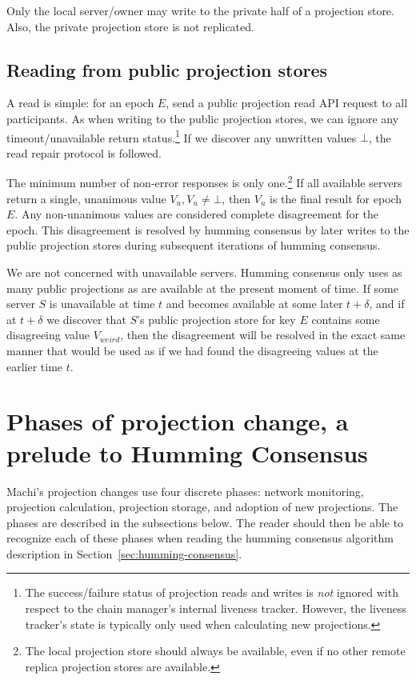 \documentclass[preprint,10pt]{sigplanconf}
\begin{document}
Only the local server/owner may write to the private half of a
projection store.  Also, the private projection store is not replicated.

\subsection{Reading from public projection stores}
\label{sub:proj-store-reading}

A read is simple: for an epoch $E$, send a public projection read API
request to all participants.  As when writing to the public projection
stores, we can ignore any timeout/unavailable return
status.\footnote{The success/failure status of projection reads and
  writes is {\em not} ignored with respect to the chain manager's
  internal liveness tracker.  However, the liveness tracker's state is
  typically only used when calculating new projections.}  If we
discover any unwritten values $\bot$, the read repair protocol is
followed.

The minimum number of non-error responses is only one.\footnote{The local
projection store should always be available, even if no other remote
replica projection stores are available.}  If all available servers
return a single, unanimous value $V_u, V_u \ne \bot$, then $V_u$ is
the final result for epoch $E$.
Any non-unanimous values are considered complete disagreement for the
epoch.  This disagreement is resolved by humming consensus by later
writes to the public projection stores during subsequent iterations of
humming consensus.

We are not concerned with unavailable servers.  Humming consensus
only uses as many public projections as are available at the present
moment of time.  If some server $S$ is unavailable at time $t$ and
becomes available at some later $t+\delta$, and if at $t+\delta$ we
discover that $S$'s public projection store for key $E$
contains some disagreeing value $V_{weird}$, then the disagreement
will be resolved in the exact same manner that would be used as if we
had found the disagreeing values at the earlier time $t$.

\section{Phases of projection change, a prelude to Humming Consensus}
\label{sec:phases-of-projection-change}

Machi's projection changes use four discrete phases: network monitoring,
projection calculation, projection storage, and
adoption of new projections.  The phases are described in the
subsections below.  The reader should then be able to recognize each
of these phases when reading the humming consensus algorithm
description in Section~\ref{sec:humming-consensus}.
\end{document}

